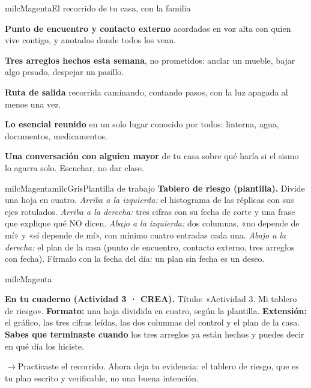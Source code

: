 \documentclass[11pt,letterpaper]{article}
\newcommand{\puente}[1]{%
  \begin{puentebox}%
    \textcolor{milcGradeDark}{$\rightarrow$}\hspace{2mm}#1%
  \end{puentebox}%
}
\begin{document}
\begin{drawbox}{milcMagenta}{El recorrido de tu casa, con la familia}
\begin{checklista}
\item \textbf{Punto de encuentro y contacto externo} acordados en voz alta con quien vive contigo, y anotados donde todos los vean.
\item \textbf{Tres arreglos hechos esta semana}, no prometidos: anclar un mueble, bajar algo pesado, despejar un pasillo.
\item \textbf{Ruta de salida} recorrida caminando, contando pasos, con la luz apagada al menos una vez.
\item \textbf{Lo esencial reunido} en un solo lugar conocido por todos: linterna, agua, documentos, medicamentos.
\item \textbf{Una conversación con alguien mayor} de tu casa sobre qué haría si el sismo lo agarra solo. Escuchar, no dar clase.
\end{checklista}
\end{drawbox}

\begin{softbox}{milcMagenta}{milcGris}{Plantilla de trabajo}
\textbf{Tablero de riesgo (plantilla).} Divide una hoja en cuatro. \emph{Arriba a la izquierda:} el histograma de las réplicas con sus ejes rotulados. \emph{Arriba a la derecha:} tres cifras con su fecha de corte y una frase que explique qué NO dicen. \emph{Abajo a la izquierda:} dos columnas, «no depende de mí» y «sí depende de mí», con mínimo cuatro entradas cada una. \emph{Abajo a la derecha:} el plan de la casa (punto de encuentro, contacto externo, tres arreglos con fecha). Fírmalo con la fecha del día: un plan sin fecha es un deseo.
\end{softbox}

\begin{infoband}{milcMagenta}


\textbf{En tu cuaderno (Actividad 3 · CREA).} Título: «Actividad 3. Mi tablero de riesgo». \textbf{Formato:} una hoja dividida en cuatro, según la plantilla. \textbf{Extensión:} el gráfico, las tres cifras leídas, las dos columnas del control y el plan de la casa. \textbf{Sabes que terminaste cuando} los tres arreglos ya están hechos y puedes decir en qué día los hiciste.
\end{infoband}

\puente{Practicaste el recorrido. Ahora deja tu evidencia: el tablero de riesgo, que es tu plan escrito y verificable, no una buena intención.}
\end{document}

